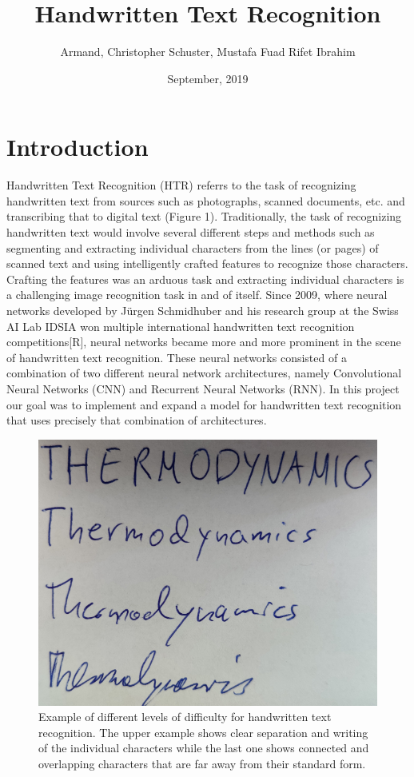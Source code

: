 \documentclass{article}
\begin{document}
\title{Handwritten Text Recognition}
\date{September, 2019}
\author{Armand, Christopher Schuster, Mustafa Fuad Rifet Ibrahim}

\maketitle
\newpage
\tableofcontents

\newpage
\section{Introduction}
Handwritten Text Recognition (HTR) referrs to the task of recognizing handwritten text from sources such as photographs, scanned documents, etc. and transcribing that to digital text (Figure 1).
Traditionally, the task of recognizing handwritten text would involve several different steps and methods such as segmenting and extracting individual characters from the lines (or pages) of scanned text and using intelligently crafted features to recognize those characters. Crafting the features was an arduous task and extracting individual characters is a challenging image recognition task in and of itself. Since 2009, where neural networks developed by Jürgen Schmidhuber and his research group at the Swiss AI Lab IDSIA won multiple international handwritten text recognition competitions[R], neural networks became more and more prominent in the scene of handwritten text recognition. These neural networks consisted of a combination of two different neural network architectures, namely Convolutional Neural Networks (CNN) and Recurrent Neural Networks (RNN). In this project our goal was to implement and expand a model for handwritten text recognition that uses precisely that combination of architectures. 
\begin{figure}[h]
\begin{center}
\includegraphics[scale=0.4]{text_example2}
\end{center}
\caption{Example of different levels of difficulty for handwritten text recognition. The upper example shows clear separation and writing of the individual characters while the last one shows connected and overlapping characters that are far away from their standard form.}
\end{figure}
\end{document}
